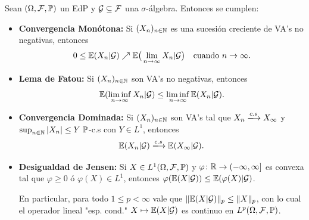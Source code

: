 \begin{theorem}
	Sean $(\Omega, \mathcal{F}, \mathbb{P})$ un EdP y $\mathcal{G} \subseteq \mathcal{F}$ una $\sigma$-álgebra. Entonces se cumplen:
	\begin{itemize}
		\item \textbf{Convergencia Monótona:} Si $(X_{n})_{n \in \mathbb{N}}$ es una sucesión creciente de VA's no negativas, entonces
		\[ 0 \leq \mathbb{E}(X_{n} | \mathcal{G}) \nearrow \mathbb{E}\big( \lim_{n \to \infty} X_{n} | \mathcal{G} \big) \quad \text{cuando } n \to \infty. \]

		\item \textbf{Lema de Fatou:} Si $(X_{n})_{n \in \mathbb{N}}$ son VA's no negativas, entonces
		\[ \mathbb{E}(\liminf_{n \to \infty} X_{n} | \mathcal{G}) \leq \liminf_{n \to \infty} \mathbb{E}(X_{n} | \mathcal{G}). \]

		\item \textbf{Convergencia Dominada:} Si $(X_{n})_{n \in \mathbb{N}}$ son VA's tal que $X_{n} \xlongrightarrow{c.s} X_{\infty}$ y $\sup_{n \in \N}|X_{n}| \leq Y \ \mbb{P}$-c.s con $Y \in L^{1}$, entonces
		\[ \mbb{E}(X_{n} | \mcal{G}) \xlongrightarrow{c.s} \mbb{E}(X_{\infty} | \mcal{G}). \]

		\item \textbf{Desigualdad de Jensen:} Si $X \in L^{1}(\Omega, \mathcal{F}, \mathbb{P})$ y $\varphi \colon \mathbb{R} \to (-\infty, \infty]$ es convexa tal que $\varphi \geq 0$ ó $\varphi(X) \in L^{1}$, entonces $\varphi(\mathbb{E}(X | \mathcal{G})) \leq \mathbb{E}(\varphi(X) | \mathcal{G})$. \par
		En particular, para todo $1 \leq p < \infty$ vale que $\| \mathbb{E}(X | \mathcal{G}) \|_{p} \leq \| X \|_{p}$, con lo cual el operador lineal "esp. cond." $X \mapsto \mathbb{E}(X | \mathcal{G})$ es continuo en $L^{p}(\Omega, \mathcal{F}, \mathbb{P})$.
	\end{itemize}
\end{theorem}

